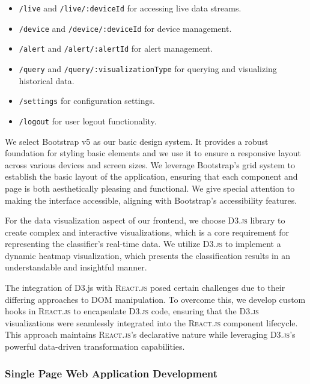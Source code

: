 \begin{itemize}
  \item \texttt{\lstinline{/live}} and \texttt{\lstinline{/live/:deviceId}} for accessing live data streams.
  \item \texttt{\lstinline{/device}} and \texttt{\lstinline{/device/:deviceId}} for device management.
  \item \texttt{\lstinline{/alert}} and \texttt{\lstinline{/alert/:alertId}} for alert management.
  \item \texttt{\lstinline{/query}} and \texttt{\lstinline{/query/:visualizationType}} for querying and visualizing historical data.
  \item \texttt{\lstinline{/settings}} for configuration settings.
  \item \texttt{\lstinline{/logout}} for user logout functionality.
\end{itemize}

We select Bootstrap v5 as our basic design system. It provides a robust foundation for styling basic elements and we use it to ensure a responsive layout across various devices and screen sizes. We leverage Bootstrap's grid system to establish the basic layout of the application, ensuring that each component and page is both aesthetically pleasing and functional. We give special attention to making the interface accessible, aligning with Bootstrap’s accessibility features.

For the data visualization aspect of our frontend, we choose \textsc{D3.js} library to create complex and interactive visualizations, which is a core requirement for representing the classifier’s real-time data. We utilize \textsc{D3.js} to implement a dynamic heatmap visualization, which presents the classification results in an understandable and insightful manner.

The integration of D3.js with \textsc{React.js} posed certain challenges due to their differing approaches to DOM manipulation. To overcome this, we develop custom hooks in \textsc{React.js} to encapsulate \textsc{D3.js} code, ensuring that the \textsc{D3.js} visualizations were seamlessly integrated into the \textsc{React.js} component lifecycle. This approach maintains \textsc{React.js}'s declarative nature while leveraging \textsc{D3.js}'s powerful data-driven transformation capabilities.

\subsubsection{Single Page Web Application Development}

